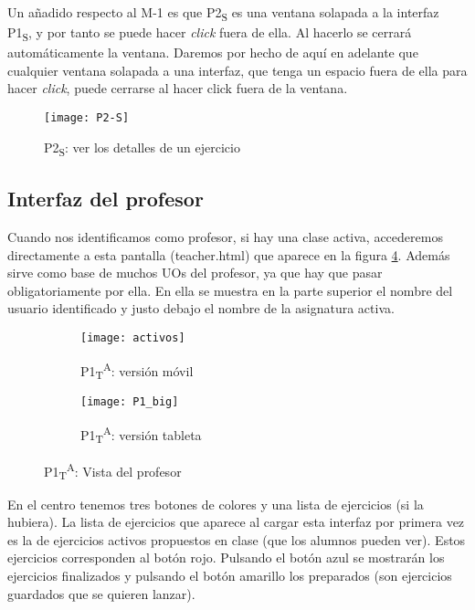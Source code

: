 Un añadido respecto al M-1 es que P2\textsubscript{S} es una ventana solapada a la interfaz P1\textsubscript{S}, y por tanto se puede hacer \textit{click} fuera de ella. Al hacerlo se cerrará automáticamente la ventana. Daremos por hecho de aquí en adelante que cualquier ventana solapada a una interfaz, que tenga un espacio fuera de ella para hacer \textit{click}, puede cerrarse al hacer click fuera de la ventana.\\

\noindent
\begin{figure}[!htbp]
	\centering
	\texttt{[image: P2-S]}
	\caption{P2\textsubscript{S}: ver los detalles de un ejercicio}
	\label{diseno-e-implementacion:interfaces:alumno:p2}
\end{figure}

\subsection{Interfaz del profesor}
\label{diseno-e-implementacion:interfaces:profesor}

Cuando nos identificamos como profesor, si hay una clase activa, accederemos directamente a esta pantalla (teacher.html) que aparece en la figura \ref{diseno-e-implementacion:interfaces:profesor}. Además sirve como base de muchos UOs del profesor, ya que hay que pasar obligatoriamente por ella. En ella se muestra en la parte superior el nombre del usuario identificado y justo debajo el nombre de la asignatura activa.\\

\noindent
\begin{figure}[!htbp]
\begin{subfigure}[t]{0.3\textwidth}
	\centering
	\texttt{[image: activos]}
	\caption{P1\textsubscript{T}\textsuperscript{A}: versión móvil}
	\label{fig:activos}
\end{subfigure}
%
\begin{subfigure}[t]{0.7\textwidth}
	\centering
	\texttt{[image: P1\_big]}
	\caption{P1\textsubscript{T}\textsuperscript{A}: versión tableta}
	\label{fig:activos_g}
\end{subfigure}

\caption{P1\textsubscript{T}\textsuperscript{A}: Vista del profesor}
\label{diseno-e-implementacion:interfaces:profesor}
\end{figure}

En el centro tenemos tres botones de colores y una lista de ejercicios (si la hubiera). La lista de ejercicios que aparece al cargar esta interfaz por primera vez es la de ejercicios activos propuestos en clase (que los alumnos pueden ver). Estos ejercicios corresponden al botón rojo. Pulsando el botón azul se mostrarán los ejercicios finalizados y pulsando el botón amarillo los preparados (son ejercicios guardados que se quieren lanzar).\\

